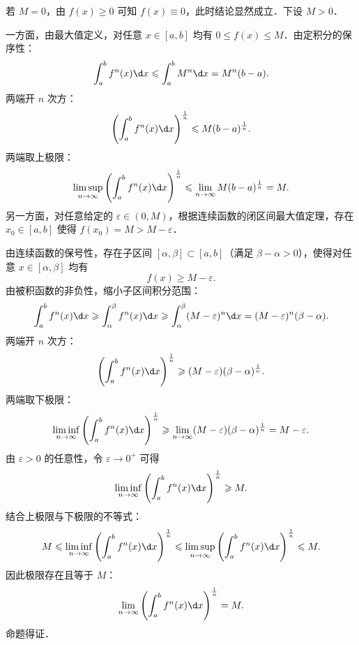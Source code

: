 \begin{myproof}
    若 $M = 0$，由 $f(x) \geqslant 0$ 可知 $f(x) \equiv 0$，此时结论显然成立．下设 $M > 0$．

    一方面，由最大值定义，对任意 $x \in [a, b]$ 均有 $0 \leqslant f(x) \leqslant M$．由定积分的保序性：
    \begin{equation}
        \int_a^b f^n(x) \d x \leqslant \int_a^b M^n \d x = M^n (b - a).
    \end{equation}
    两端开 $n$ 次方：
    \begin{equation}
        \left( \int_a^b f^n(x) \d x \right)^{\frac{1}{n}} \leqslant M (b - a)^{\frac{1}{n}}.
    \end{equation}
    两端取上极限：
    \begin{equation}
        \limsup_{n\to \infty} \left( \int_a^b f^n(x) \d x \right)^{\frac{1}{n}} \leqslant \lim_{n\to \infty} M (b - a)^{\frac{1}{n}} = M.
    \end{equation}
    另一方面，对任意给定的 $\varepsilon \in (0, M)$，根据连续函数的闭区间最大值定理，存在 $x_0 \in [a, b]$ 使得 $f(x_0) = M > M - \varepsilon$．

    由连续函数的保号性，存在子区间 $[\alpha, \beta] \subset [a, b]$（满足 $\beta - \alpha > 0$），使得对任意 $x \in [\alpha, \beta]$ 均有
    \begin{equation}
        f(x) \geqslant M - \varepsilon.
    \end{equation}
    由被积函数的非负性，缩小子区间积分范围：
    \begin{equation}
        \int_a^b f^n(x) \d x \geqslant \int_\alpha^\beta f^n(x) \d x \geqslant \int_\alpha^\beta (M - \varepsilon)^n \d x = (M - \varepsilon)^n (\beta - \alpha).
    \end{equation}
    两端开 $n$ 次方：
    \begin{equation}
        \left( \int_a^b f^n(x) \d x \right)^{\frac{1}{n}} \geqslant (M - \varepsilon)(\beta - \alpha)^{\frac{1}{n}}.
    \end{equation}
    两端取下极限：
    \begin{equation}
        \liminf_{n\to \infty} \left( \int_a^b f^n(x) \d x \right)^{\frac{1}{n}} \geqslant \lim_{n\to \infty} (M - \varepsilon)(\beta - \alpha)^{\frac{1}{n}} = M - \varepsilon.
    \end{equation}
    由 $\varepsilon > 0$ 的任意性，令 $\varepsilon \to 0^+$ 可得
    \begin{equation}
        \liminf_{n\to \infty} \left( \int_a^b f^n(x) \d x \right)^{\frac{1}{n}} \geqslant M.
    \end{equation}
    结合上极限与下极限的不等式：
    \begin{equation}
        M \leqslant \liminf_{n\to \infty} \left( \int_a^b f^n(x) \d x \right)^{\frac{1}{n}} \leqslant \limsup_{n\to \infty} \left( \int_a^b f^n(x) \d x \right)^{\frac{1}{n}} \leqslant M.
    \end{equation}
    因此极限存在且等于 $M$：
    \begin{equation}
        \lim_{n\to \infty} \left( \int_a^b f^n(x) \d x \right)^{\frac{1}{n}} = M.
    \end{equation}
    命题得证．
\end{myproof}

